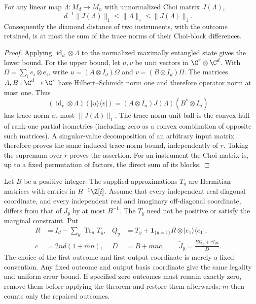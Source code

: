 \begin{lemma}\label{lem:choidiamond66}
For any linear map $\Lambda:M_d\to M_n$ with unnormalized Choi matrix
$J(\Lambda)$,
\[
 d^{-1}\|J(\Lambda)\|_1\le\|\Lambda\|_\diamond
                                      \le\|J(\Lambda)\|_1.
\]
Consequently the diamond distance of two instruments, with the outcome
retained, is at most the sum of the trace norms of their Choi-block
differences.
\end{lemma}
\begin{proof}
Applying $\operatorname{id}_d\otimes\Lambda$ to the normalized
maximally entangled state gives the lower bound. For the upper bound,
let $u,v$ be unit vectors in $\C^r\otimes\C^d$. With
$\Omega=\sum_i e_i\otimes e_i$, write
$u=(A\otimes I_d)\Omega$ and $v=(B\otimes I_d)\Omega$.
The matrices $A,B:\C^d\to\C^r$ have Hilbert--Schmidt norm one and
therefore operator norm at most one. Thus
\[
 (\operatorname{id}_r\otimes\Lambda)(|u\rangle\langle v|)
       =(A\otimes I_n)J(\Lambda)(B^*\otimes I_n)
\]
has trace norm at most $\|J(\Lambda)\|_1$. The trace-norm unit ball
is the convex hull of rank-one partial isometries (including zero as a
convex combination of opposite such matrices). A singular-value
decomposition of an arbitrary input matrix therefore proves the same induced
trace-norm bound, independently of $r$. Taking the supremum over $r$
proves the assertion. For an instrument the Choi matrix is, up to a
fixed permutation of factors, the direct sum of its blocks.
\end{proof}

Let $B$ be a positive integer. The supplied approximations $T_y$ are
Hermitian matrices with entries in $B^{-1}\Z[i]$. Assume that every
independent real diagonal coordinate, and every independent real and
imaginary off-diagonal coordinate, differs from that of $J_y$ by at
most $B^{-1}$. The $T_y$ need not be positive or satisfy the marginal
constraint. Put
\begin{align}
 R&=I_d-\sum_y\operatorname{Tr}_{n}T_y,&
 Q_y&=T_y+\mathbf1_{\{y=1\}}R\otimes|e_1\rangle\langle e_1|,
                                                    \label{eq:choirepair66}\\
 c&=2nd(1+mn),&D&=B+mnc,\qquad
 \widetilde J_y=\frac{BQ_y+cI_{dn}}{D}.\label{eq:choigrid66}
\end{align}
The choice of the first outcome and first output coordinate is merely
a fixed convention. Any fixed outcome and output basis coordinate give
the same legality and uniform error bound. If specified zero outcomes
must remain exactly zero, remove them before applying the theorem and
restore them afterwards; $m$ then counts only the repaired outcomes.

